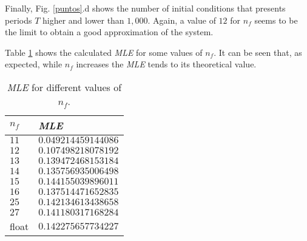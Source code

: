 Finally, Fig. \ref{puntos}.d shows the number of initial conditions that
presents periods $T$ higher and lower than $1,000$. Again, a value
of $12$ for $n_f$ seems to be the limit to obtain a good
approximation of the system.

Table \ref{tabla:MLE} shows the calculated \textsl{MLE} for some values of $n_f$. It can be seen that, as expected, while $n_f$ increases the \textsl{MLE} tends to its theoretical value.
 
\begin{table}[!t]\label{tabla:MLE}
\begin{center}
\caption{\textsl{MLE} for different values of $n_f$.}
\label{tabla:MLE}
\begin{tabular}{l l}

  \hline

  $n_f$ & \textsl{MLE} \\
  \hline
  \hline
  $11$ & $0.049214459144086$ \\
  $12$ & $0.107498218078192$ \\
  $13$ & $0.139472468153184$ \\
  $14$ & $ 0.135756935006498$ \\
  $15$ & $0.144155039896011$ \\
  $16$ & $0.137514471652835$ \\
  $25$ & $0.142134613438658$ \\
  $27$ & $0.141180317168284$ \\
  float & $0.142275657734227$ \\
   \hline

\end{tabular}
\end{center}

\end{table}